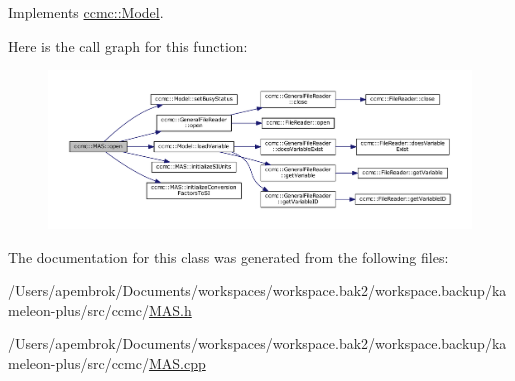 Implements \hyperlink{classccmc_1_1_model_a3c64dc635c2c1a2fe2f8efa2a3666282}{ccmc\-::\-Model}.



Here is the call graph for this function\-:\nopagebreak
\begin{figure}[H]
\begin{center}
\leavevmode
\includegraphics[width=350pt]{classccmc_1_1_m_a_s_a054e168c8a692b724471c0c3c775dc25_cgraph}
\end{center}
\end{figure}




The documentation for this class was generated from the following files\-:\begin{DoxyCompactItemize}
\item 
/\-Users/apembrok/\-Documents/workspaces/workspace.\-bak2/workspace.\-backup/kameleon-\/plus/src/ccmc/\hyperlink{_m_a_s_8h}{M\-A\-S.\-h}\item 
/\-Users/apembrok/\-Documents/workspaces/workspace.\-bak2/workspace.\-backup/kameleon-\/plus/src/ccmc/\hyperlink{_m_a_s_8cpp}{M\-A\-S.\-cpp}\end{DoxyCompactItemize}
